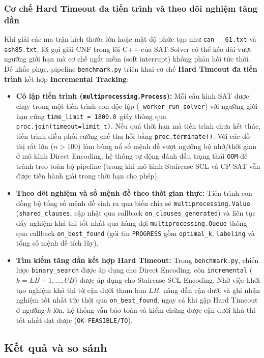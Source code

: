 \documentclass[a4paper,fleqn]{cas-sc}
\begin{document}
\subsubsection{Cơ chế Hard Timeout đa tiến trình và theo dõi nghiệm tăng dần}
Khi giải các ma trận kích thước lớn hoặc mật độ phức tạp như \texttt{can\_\_\_61.txt} và \texttt{ash85.txt}, lời gọi giải CNF trong lõi C++ của SAT Solver có thể kéo dài vượt ngưỡng giới hạn mà cơ chế ngắt mềm (soft interrupt) không phản hồi tức thời. Để khắc phục, pipeline \texttt{benchmark.py} triển khai cơ chế \textbf{Hard Timeout đa tiến trình} kết hợp \textbf{Incremental Tracking}:
\begin{itemize}
    \item \textbf{Cô lập tiến trình (\texttt{multiprocessing.Process}):} Mỗi cấu hình SAT được chạy trong một tiến trình con độc lập (\texttt{\_worker\_run\_solver}) với ngưỡng giới hạn cứng \texttt{time\_limit = 1800.0}~giây thông qua \texttt{proc.join(timeout=limit\_t)}. Nếu quá thời hạn mà tiến trình chưa kết thúc, tiến trình điều phối cưỡng chế thu hồi bằng \texttt{proc.terminate()}. Với các đồ thị rất lớn ($n > 100$) làm bùng nổ số mệnh đề vượt ngưỡng bộ nhớ/thời gian ở mô hình Direct Encoding, hệ thống tự động đánh dấu trạng thái \texttt{OOM} để tránh treo toàn bộ pipeline (trong khi mô hình Staircase SCL và CP-SAT vẫn được tiến hành giải trong thời hạn cho phép).
    \item \textbf{Theo dõi nghiệm và số mệnh đề theo thời gian thực:} Tiến trình con đồng bộ tổng số mệnh đề sinh ra qua biến chia sẻ \texttt{multiprocessing.Value} (\texttt{shared\_clauses}, cập nhật qua callback \texttt{on\_clauses\_generated}) và liên tục đẩy nghiệm khả thi tốt nhất qua hàng đợi \texttt{multiprocessing.Queue} thông qua callback \texttt{on\_best\_found} (gói tin \texttt{PROGRESS} gồm \texttt{optimal\_k}, \texttt{labeling} và tổng số mệnh đề tích lũy).
    \item \textbf{Tìm kiếm tăng dần kết hợp Hard Timeout:} Trong \texttt{benchmark.py}, chiến lược \texttt{binary\_search} được áp dụng cho Direct Encoding, còn \texttt{incremental} ($k = LB + 1, \dots, UB$) được áp dụng cho Staircase SCL Encoding. Nhờ việc khởi tạo nghiệm khả thi từ cận dưới tham lam $LB$, nâng dần cận dưới và ghi nhận nghiệm tốt nhất tức thời qua \texttt{on\_best\_found}, ngay cả khi gặp Hard Timeout ở ngưỡng $k$ lớn, hệ thống vẫn bảo toàn và kiểm chứng được cận dưới khả thi tốt nhất đạt được (\texttt{OK-FEASIBLE/TO}).
\end{itemize}

\subsection{Kết quả và so sánh}
\end{document}
